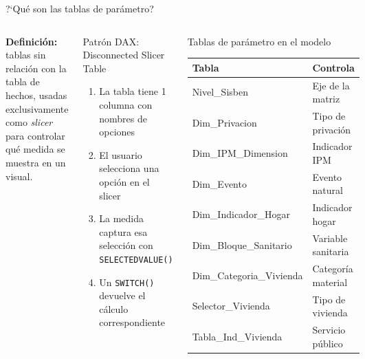 \documentclass[aspectratio=169, 10pt]{beamer}
\begin{document}
\begin{frame}{?`Qu\'e son las tablas de par\'ametro?}
\begin{columns}
\textbf{Definici\'on:} tablas sin relaci\'on con la tabla de hechos, usadas exclusivamente como \textit{slicer} para controlar qu\'e medida se muestra en un visual.

\vspace{0.4cm}
\begin{alertblock}{Patr\'on DAX: Disconnected Slicer Table}
\begin{enumerate}\footnotesize
  \item La tabla tiene 1 columna con nombres de opciones
  \item El usuario selecciona una opci\'on en el slicer
  \item La medida captura esa selecci\'on con \texttt{SELECTEDVALUE()}
  \item Un \texttt{SWITCH()} devuelve el c\'alculo correspondiente
\end{enumerate}
\end{alertblock}

\begin{block}{Tablas de par\'ametro en el modelo}
\begin{tabular}{ll}
\toprule
Tabla & Controla \\
\midrule
Nivel\_Sisben & Eje de la matriz \\
Dim\_Privacion & Tipo de privaci\'on \\
Dim\_IPM\_Dimension & Indicador IPM \\
Dim\_Evento & Evento natural \\
Dim\_Indicador\_Hogar & Indicador hogar \\
Dim\_Bloque\_Sanitario & Variable sanitaria \\
Dim\_Categoria\_Vivienda & Categor\'ia material \\
Selector\_Vivienda & Tipo de vivienda \\
Tabla\_Ind\_Vivienda & Servicio p\'ublico \\
\bottomrule
\end{tabular}
\end{block}
\end{columns}
\end{frame}
\end{document}
